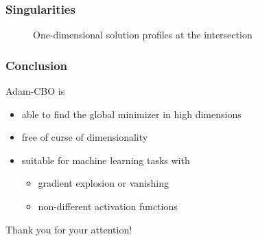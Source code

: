 \documentclass{beamer}
\begin{document}
\begin{frame}
\frametitle{Singularities}

\begin{figure}
	\caption{One-dimensional solution profiles at the intersection}
\end{figure}	
\end{frame}

\begin{frame}
\frametitle{Conclusion}

Adam-CBO is
\begin{itemize}
	\item able to find the global minimizer in high dimensions
	\item free of curse of dimensionality
	\item suitable for machine learning tasks with
	\begin{itemize}
		\item gradient explosion or vanishing
		\item non-different activation functions
	\end{itemize}
\end{itemize}
{\huge\medskip
\begin{center}
	Thank you for your attention!
\end{center}
}
\end{frame}
\end{document}
